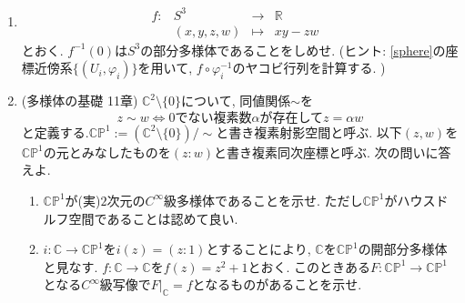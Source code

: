 \documentclass[dvipdfmx,a4paper,11pt]{article}
\newcommand{\R}{\mathbb{R}}
\newcommand{\C}{\mathbb{C}}
\theoremstyle{definition}
\begin{document}
\begin{enumerate}[label=\textbf{問}\ref*{sec-manifold}.\arabic*]
\item 
	$$
\begin{array}{ccccc}
f: &S^{3}& \rightarrow & \R & \\
&(x,y,z,w) & \longmapsto & xy - zw&
\end{array}
$$
とおく.  $f^{-1}(0)$は$S^{3}$の部分多様体であることをしめせ. (ヒント: \ref{sphere}の座標近傍系$\{ (U_i , \varphi_{i})\}$を用いて, $f \circ \varphi_{i}^{-1}$のヤコビ行列を計算する. )



\item  (多様体の基礎 11章) $\C^{2} \setminus \{ 0\}$について, 同値関係$\sim$を
	$$
	z \sim w \Leftrightarrow \text{0でない複素数$\alpha$が存在して$z = \alpha w$}
	$$
	と定義する.$ \C\mathbb{P}^{1}:= (\C^{2} \setminus \{ 0\})/\sim$と書き複素射影空間と呼ぶ. 以下$(z, w)$を$\C\mathbb{P}^{1}$の元とみなしたものを$(z :  w)$と書き複素同次座標と呼ぶ.
	次の問いに答えよ.
	\begin{enumerate}
	     \setlength{\parskip}{0cm}
  \setlength{\itemsep}{0pt} 
\item  $\C\mathbb{P}^{1}$が(実)$2$次元の$C^{\infty}$級多様体であることを示せ. ただし$\C \mathbb{P}^{1}$がハウスドルフ空間であることは認めて良い. 
\item $i :\C \rightarrow \C\mathbb{P}^{1}$を$i(z) = (z:1)$とすることにより, $\C$を$\C\mathbb{P}^{1}$の開部分多様体と見なす.  $f : \C \rightarrow \C$を$f(z) = z^2 +1$とおく. このときある$F : \C\mathbb{P}^{1} \rightarrow \C\mathbb{P}^1$となる$C^{\infty}$級写像で$F|_{\C} = f$となるものがあることを示せ. 
	\end{enumerate}
	
	


\end{enumerate}
\end{document}
